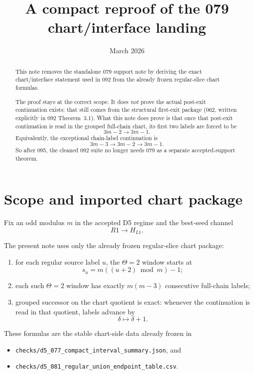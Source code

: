 \documentclass[11pt]{article}
\title{A compact reproof of the 079 chart/interface landing}
\author{}
\date{March 2026}
\begin{document}
\maketitle

\begin{abstract}
This note removes the standalone 079 support note by deriving the exact
chart/interface statement used in 092 from the already frozen regular-slice
chart formulas.

The proof stays at the correct scope. It does \emph{not} prove the actual
post-exit continuation exists; that still comes from the structural first-exit
package (062, written explicitly in 092 Theorem~3.1). What this note does
prove is that once that post-exit continuation is read in the grouped
full-chain chart, its first two labels are forced to be
\[
3m-2 \to 3m-1.
\]
Equivalently, the exceptional chain-label continuation is
\[
3m-3 \to 3m-2 \to 3m-1.
\]
So after 095, the cleaned 092 suite no longer needs 079 as a separate
accepted-support theorem.
\end{abstract}

\section{Scope and imported chart package}

Fix an odd modulus $m$ in the accepted D5 regime and the best-seed channel
\[
R1 \to H_{L1}.
\]

The present note uses only the already frozen regular-slice chart package:
\begin{enumerate}[label=\textup{(\arabic*)},leftmargin=2.5em]
\item for each regular source label $u$, the $\Theta=2$ window starts at
      \[
      s_u = m((u+2) \bmod m)-1;
      \]
\item each such $\Theta=2$ window has exactly $m(m-3)$ consecutive full-chain
      labels;
\item grouped successor on the chart quotient is exact: whenever the
      continuation is read in that quotient, labels advance by
      \[
      \delta \mapsto \delta+1.
      \]
\end{enumerate}

These formulas are the stable chart-side data already frozen in
\begin{itemize}[leftmargin=2em]
\item \texttt{checks/d5\_077\_compact\_interval\_summary.json}, and
\item \texttt{checks/d5\_081\_regular\_union\_endpoint\_table.csv}.
\end{itemize}
\end{document}
